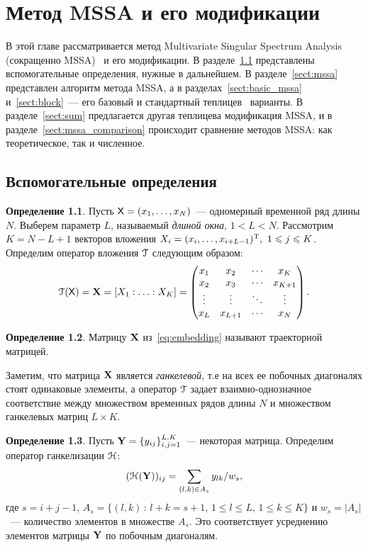 \documentclass[specialist,
substylefile = spbu_report.rtx,
subf,href,colorlinks=true, 12pt]{disser}
\theoremstyle{definition}
\newtheorem{definition}{Определение}
\begin{document}
\chapter{Метод MSSA и его модификации}\label{chpt:mssa}
В этой главе рассматривается метод Multivariate Singular Spectrum Analysis (сокращенно MSSA)~\cite{Golyandina_2015} и его модификации. В разделе~\ref{sect:definitions} представлены вспомогательные определения, нужные в дальнейшем. В разделе~\ref{sect:mssa} представлен алгоритм метода MSSA, а в разделах~\ref{sect:basic_mssa} и~\ref{sect:block}~--- его базовый и стандартный теплицев~\cite{Plaut1994SpellsOL} варианты. В разделе~\ref{sect:sum} предлагается другая теплицева модификация MSSA, и в разделе~\ref{sect:mssa_comparison} происходит сравнение методов MSSA: как теоретическое, так и численное.

\section{Вспомогательные определения}\label{sect:definitions}
\begin{definition}
	Пусть $\mathsf{X}=(x_1,\ldots,x_N)$~--- одномерный временной ряд длины $N$. Выберем параметр $L$, называемый \emph{длиной окна}, $1<L<N$. Рассмотрим $K=N-L+1$ векторов вложения $X_i=(x_{i},\ldots, x_{i+L-1})^{\mathrm{T}},\ 1\leqslant j \leqslant K$. Определим оператор вложения $\EuScript{T}$ следующим образом:
	\begin{equation}\label{eq:embedding}
		\EuScript{T}(\mathsf{X})=\mathbf{X}=[X_1:\ldots:X_K]=
		\begin{pmatrix}
			x_1    & x_2     & \cdots & x_K     \\
			x_2    & x_3     & \cdots & x_{K+1} \\
			\vdots & \vdots  & \ddots & \vdots  \\
			x_L    & x_{L+1} & \cdots & x_N
		\end{pmatrix}.
	\end{equation}
\end{definition}
\begin{definition}
	Матрицу $\mathbf{X}$ из~\eqref{eq:embedding} называют траекторной матрицей.
\end{definition}\noindent
Заметим, что матрица $\mathbf{X}$ является \emph{ганкелевой}, т.е на всех ее побочных диагоналях стоят одинаковые элементы, а оператор $\EuScript{T}$ задает взаимно-однозначное соответствие между множеством временных рядов длины $N$ и множеством ганкелевых матриц $L\times K$.
\begin{definition}
	Пусть $\mathbf{Y}=\{y_{ij}\}_{i,j=1}^{L,K}$~--- некоторая матрица. Определим оператор ганкелизации $\EuScript{H}$:
	\begin{equation}\label{eq:averaging}
		(\EuScript{H}(\mathbf{Y}))_{ij}=\sum_{(l,k)\in A_s}y_{lk}/w_s,
	\end{equation}
	где $s=i+j-1$, $A_s=\{(l,k)\, :\, l+k=s+1,\, 1\leqslant l\leqslant L,\, 1\leqslant k\leqslant K\}$ и $w_s=|A_s|$~--- количество элементов в множестве $A_s$. Это соответствует
	усреднению элементов матрицы $\mathbf{Y}$ по побочным диагоналям.
\end{definition}
\end{document}
